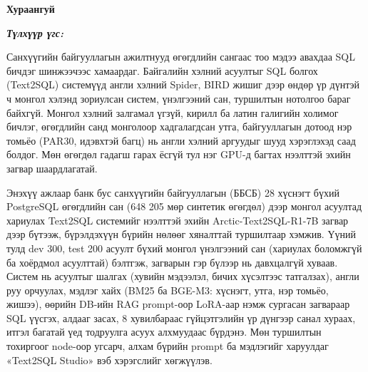 

\begin{center}
{\scshape\Large \univname\par}
{\scshape\large \facname\par}\vspace{0.5cm}
{\huge\textbf{{Хураангуй}} \par}
\bigskip
{\Large{\ttitle} \par}
\bigskip

{\normalsize \shortname \par}
\addressname
\end{center}

\textit{\textbf{Түлхүүр үгс: \keywordnames}}
\bigskip

Санхүүгийн байгууллагын ажилтнууд өгөгдлийн сангаас тоо мэдээ авахдаа SQL бичдэг шинжээчээс хамаардаг. Байгалийн
хэлний асуултыг SQL болгох (Text2SQL) системүүд англи хэлний Spider, BIRD жишиг дээр өндөр үр дүнтэй ч
монгол хэлэнд зориулсан систем, үнэлгээний сан, туршилтын нотолгоо бараг байхгүй. Монгол хэлний залгамал үгзүй,
кирилл ба латин галигийн холимог бичлэг, өгөгдлийн санд монголоор хадгалагдсан утга, байгууллагын дотоод нэр томьёо
(PAR30, идэвхтэй багц) нь англи хэлний аргуудыг шууд хэрэглэхэд саад болдог. Мөн өгөгдөл гадагш гарах
ёсгүй тул нэг GPU-д багтах нээлттэй эхийн загвар шаардлагатай.

Энэхүү ажлаар банк бус санхүүгийн байгууллагын (ББСБ) 28 хүснэгт бүхий PostgreSQL өгөгдлийн сан (648 205 мөр
синтетик өгөгдөл) дээр монгол асуултад хариулах Text2SQL системийг нээлттэй эхийн Arctic-Text2SQL-R1-7B загвар дээр
бүтээж, бүрэлдэхүүн бүрийн нөлөөг хяналттай туршилтаар хэмжив. Үүний тулд dev 300, test 200 асуулт бүхий монгол
үнэлгээний сан (хариулах боломжгүй ба хоёрдмол асуулттай) бэлтгэж, загварын гэр бүлээр нь давхцалгүй хуваав. Систем нь
асуултыг шалгах (хувийн мэдээлэл, бичих хүсэлтээс татгалзах), англи руу орчуулах, мэдлэг хайх (BM25 ба BGE-M3: хүснэгт, утга, нэр томьёо, жишээ), өөрийн DB-ийн RAG prompt-оор LoRA-аар
нэмж сургасан загвараар SQL үүсгэх, алдааг засах, 8 хувилбараас гүйцэтгэлийн үр дүнгээр санал хураах, итгэл багатай
үед тодруулга асуух алхмуудаас бүрдэнэ. Мөн туршилтын тохиргоог node-оор угсарч, алхам бүрийн prompt ба мэдлэгийг
харуулдаг «Text2SQL Studio» вэб хэрэгслийг хөгжүүлэв.

